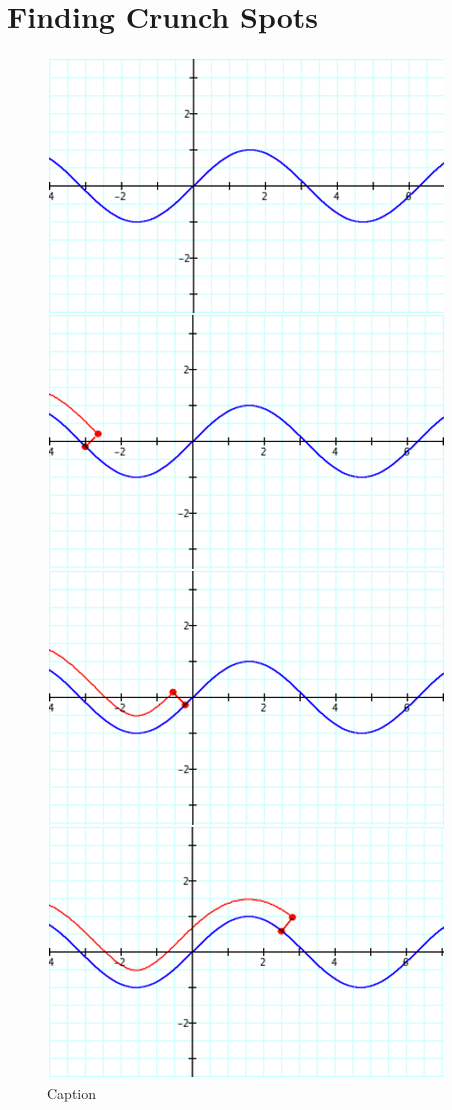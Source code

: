 \section{Finding Crunch Spots}

\renewcommand\w{0.25\linewidth}
\renewcommand\fw{0.9\linewidth}

\begin{figure}
  \label{crunch:1}
  \includegraphics[width=\fw]{img/09-crunch/01.png}
  \caption{Caption}
\end{figure}

